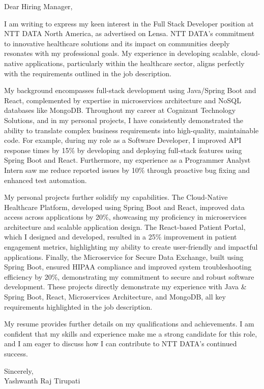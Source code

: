 \documentclass[letterpaper,11pt]{article}
\begin{document}
\begin{flushleft}
Dear Hiring Manager,

\vspace{12pt}

I am writing to express my keen interest in the Full Stack Developer position at NTT DATA North America, as advertised on Lensa.  NTT DATA's commitment to innovative healthcare solutions and its impact on communities deeply resonates with my professional goals. My experience in developing scalable, cloud-native applications, particularly within the healthcare sector, aligns perfectly with the requirements outlined in the job description.

\vspace{12pt}

My background encompasses full-stack development using Java/Spring Boot and React, complemented by expertise in microservices architecture and NoSQL databases like MongoDB.  Throughout my career at Cognizant Technology Solutions, and in my personal projects, I have consistently demonstrated the ability to translate complex business requirements into high-quality, maintainable code. For example, during my role as a Software Developer, I improved API response times by 15\% by developing and deploying full-stack features using Spring Boot and React.  Furthermore, my experience as a Programmer Analyst Intern saw me reduce reported issues by 10\% through proactive bug fixing and enhanced test automation.


\vspace{12pt}

My personal projects further solidify my capabilities.  The Cloud-Native Healthcare Platform, developed using Spring Boot and React, improved data access across applications by 20\%, showcasing my proficiency in microservices architecture and scalable application design.  The React-based Patient Portal, which I designed and developed, resulted in a 25\% improvement in patient engagement metrics, highlighting my ability to create user-friendly and impactful applications.  Finally,  the Microservice for Secure Data Exchange, built using Spring Boot, ensured HIPAA compliance and improved system troubleshooting efficiency by 20\%, demonstrating my commitment to secure and robust software development.  These projects directly demonstrate my experience with Java & Spring Boot, React, Microservices Architecture, and MongoDB, all key requirements highlighted in the job description.


\vspace{2pt}

My resume provides further details on my qualifications and achievements. I am confident that my skills and experience make me a strong candidate for this role, and I am eager to discuss how I can contribute to NTT DATA's continued success.

\vspace{20pt}

Sincerely, \\
Yashwanth Raj Tirupati

\end{flushleft}
\end{document}

